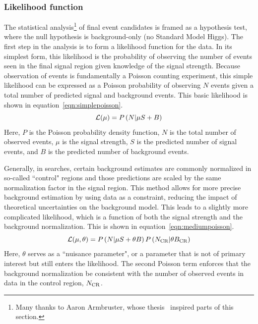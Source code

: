 \subsubsection{Likelihood function}

The statistical analysis\footnote{Many thanks to Aaron Armbruster, whose thesis~\cite{ArmbrusterThesis} inspired parts of this section.} of final event candidates is framed as a hypothesis test, where the null hypothesis is background-only (no Standard Model Higgs). The first step in the analysis is to form a likelihood function for the data. In its simplest form, this likelihood is the probability of observing the number of events seen in the final signal region given knowledge of the signal strength. Because observation of events is fundamentally a Poisson counting experiment, this simple likelihood can be expressed as a Poisson probability of observing $N$ events given a total number of predicted signal and background events. This basic likelihood is shown in equation~\ref{eqn:simplepoisson}.
%
\begin{equation}
\mathcal{L}(\mu) = P\left(N | \mu S + B\right)
\label{eqn:simplepoisson}
\end{equation}
%
Here, $P$ is the Poisson probability density function, $N$ is the total number of observed events, $\mu$ is the signal strength, $S$ is the predicted number of signal events, and $B$ is the predicted number of background events. 

Generally, in searches, certain background estimates are commonly normalized in so-called ``control" regions and those predictions are scaled by the same normalization factor in the signal region. This method allows for more precise background estimation by using data as a constraint, reducing the impact of theoretical uncertainties on the background model. This leads to a slightly more complicated likelihood, which is a function of both the signal strength and the background normalization. This is shown in equation~\ref{eqn:mediumpoisson}.
%
\begin{equation}
\mathcal{L}(\mu, \theta) = P\left(N | \mu S + \theta B\right)P\left(N_{\rm CR} | \theta B_{\rm CR}\right)
\label{eqn:mediumpoisson}
\end{equation}
%
Here, $\theta$ serves as a ``nuisance parameter", or a parameter that is not of primary interest but still enters the likelihood. The second Poisson term enforces that the background normalization be consistent with the number of observed events in data in the control region, $N_{\rm CR}$.

